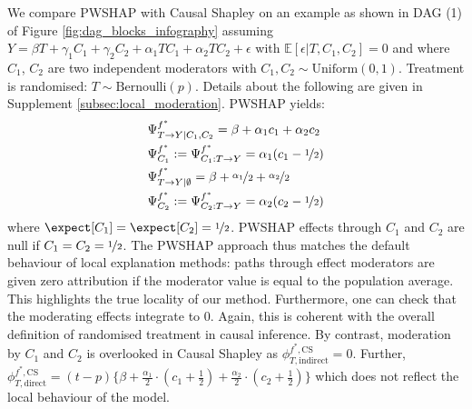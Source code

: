 \documentclass{article}
\theoremstyle{plain}
\theoremstyle{definition}
\theoremstyle{remark}
\newcommand{\effect}{\Psi}
\theoremstyle{mystyle}
\begin{document}
We compare PWSHAP with Causal Shapley on an example as shown in DAG (1) of Figure \ref{fig:dag_blocks_infography} assuming $Y = \beta T + \gamma_1C_1 + \gamma_2C_2 + \alpha_1TC_1 + \alpha_2TC_2 + \epsilon$ with $\mathbb{E}[\epsilon|T,C_1,C_2] = 0$ and where $C_1$, $C_2$ are two independent moderators with $C_1, C_2 \sim \text{Uniform}(0,1)$. Treatment is randomised: $T \sim \text{Bernoulli}(p)$. Details about the following are given in Supplement \ref{subsec:local_moderation}. PWSHAP yields:
\begin{align*}
&\effect^{f^*}_{T \rightarrow Y | C_1, C_2} = \beta + \alpha_1c_1 + \alpha_2c_2 \\
&\effect^{f^*}_{C_1} := \effect^{f^*}_{C_1: T \rightarrow Y} = \alpha_1 (c_1 - \nicefrac{1}{2}) \\
&\effect^{f^*}_{T \rightarrow Y | \emptyset} = \beta + \nicefrac{\alpha_1}{2} + \nicefrac{\alpha_2}{2} \\
&\effect^{f^*}_{C_2} := \effect^{f^*}_{C_2: T \rightarrow Y} = \alpha_2 (c_2 - \nicefrac{1}{2}) 
\end{align*}
where $\expect [C_1] = \expect [C_2] = \nicefrac{1}{2}$. PWSHAP effects through $C_1$ and $C_2$ are null if $C_1=C_2= \nicefrac{1}{2}$. The PWSHAP approach thus matches the default behaviour of local explanation methods: paths through effect moderators are given zero attribution if the moderator value is equal to the population average. This highlights the true locality of our method. Furthermore, one can check that the moderating effects integrate to $0$. Again, this is coherent with the overall definition of randomised treatment in causal inference. By contrast, moderation by $C_1$ and $C_2$ is overlooked in Causal Shapley as $\phi^{f^*, \text{CS}}_{T, \text{indirect}} = 0$. Further, $\phi^{f^*, \text{CS}}_{T, \text{direct}} = (t - p)\{\beta + \frac{\alpha_1}{2} \cdot (c_1 + \frac{1}{2}) + \frac{\alpha_2}{2} \cdot (c_2 + \frac{1}{2})\}$ which does not reflect the local behaviour of the model.
\end{document}
